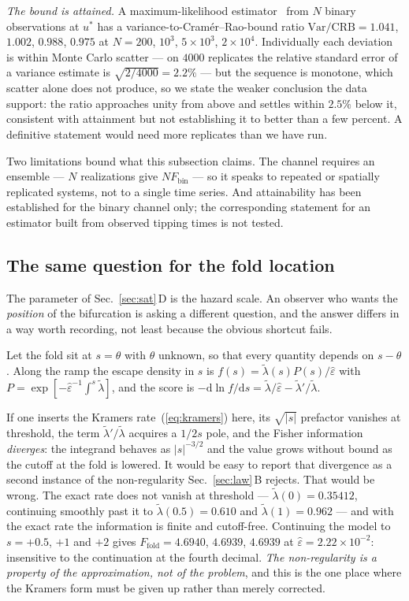 \documentclass[%
 twocolumn,
 superscriptaddress,
 amsmath,amssymb,
 aps,
 pre,
 floatfix,
]{revtex4-2}
\newcommand{\dd}{\mathrm{d}}
\newcommand{\Sig}{\hat\varepsilon}
\begin{document}
\emph{The bound is attained.}  A maximum-likelihood estimator~\cite{LehmannCasella1998} from $N$ binary observations at $u^\ast$ has a variance-to-Cram\'er--Rao-bound ratio $\mathrm{Var}/\mathrm{CRB}=1.041$, $1.002$, $0.988$, $0.975$ at $N=200$, $10^3$, $5\times10^3$, $2\times10^4$.  Individually each deviation is within Monte Carlo scatter --- on $4000$ replicates the relative standard error of a variance estimate is $\sqrt{2/4000}=2.2\%$ --- but the sequence is monotone, which scatter alone does not produce, so we state the weaker conclusion the data support: the ratio approaches unity from above and settles within $2.5\%$ below it, consistent with attainment but not establishing it to better than a few percent.  A definitive statement would need more replicates than we have run.

Two limitations bound what this subsection claims.  The channel requires an ensemble --- $N$ realizations give $N F_{\mathrm{bin}}$ --- so it speaks to repeated or spatially replicated systems, not to a single time series.  And attainability has been established for the binary channel only; the corresponding statement for an estimator built from observed tipping times is not tested.

\subsection{\label{sec:foldloc}The same question for the fold location}

The parameter of Sec.~\ref{sec:sat}\,D is the hazard scale.  An observer who wants the \emph{position} of the bifurcation is asking a different question, and the answer differs in a way worth recording, not least because the obvious shortcut fails.

Let the fold sit at $s=\theta$ with $\theta$ unknown, so that every quantity depends on $s-\theta$.  Along the ramp the escape density in $s$ is $f(s)=\tilde\lambda(s)P(s)/\Sig$ with $P=\exp[-\Sig^{-1}\!\int^s\tilde\lambda]$, and the score is $-\dd\ln f/\dd s=\tilde\lambda/\Sig-\tilde\lambda'/\tilde\lambda$.

If one inserts the Kramers rate~(\ref{eq:kramers}) here, its $\sqrt{|s|}$ prefactor vanishes at threshold, the term $\tilde\lambda'/\tilde\lambda$ acquires a $1/2s$ pole, and the Fisher information \emph{diverges}: the integrand behaves as $|s|^{-3/2}$ and the value grows without bound as the cutoff at the fold is lowered.  It would be easy to report that divergence as a second instance of the non-regularity Sec.~\ref{sec:law}\,B rejects.  That would be wrong.  The exact rate does not vanish at threshold --- $\tilde\lambda(0)=0.35412$, continuing smoothly past it to $\tilde\lambda(0.5)=0.610$ and $\tilde\lambda(1)=0.962$ --- and with the exact rate the information is finite and cutoff-free.  Continuing the model to $s=+0.5$, $+1$ and $+2$ gives $F_{\mathrm{fold}}=4.6940$, $4.6939$, $4.6939$ at $\Sig=2.22\times10^{-2}$: insensitive to the continuation at the fourth decimal.  \emph{The non-regularity is a property of the approximation, not of the problem}, and this is the one place where the Kramers form must be given up rather than merely corrected.
\end{document}

